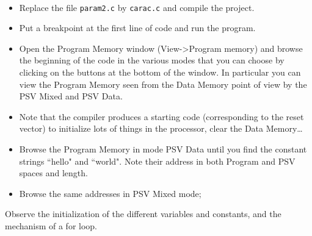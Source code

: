 \documentclass[10pt,a4paper]{article}
\theoremstyle{definition}%
\newcommand{\kw}[1]{\texttt{#1}}
\begin{document}
~

\begin{itemize}
\item Replace the file \kw{param2.c} by  \kw{carac.c}  and compile the project.
\item Put a breakpoint at the first line of code and run the program.
\item Open the Program Memory window (View->Program memory) and browse the beginning of the code in the various modes that you can choose by clicking on the buttons at the bottom of the window. In particular you can view the Program Memory seen from the Data Memory point of view by the PSV Mixed and PSV Data.
\item Note that the compiler produces a starting code (corresponding to the reset vector) to initialize lots of things in the processor, clear the Data Memory\dots

\item Browse the Program Memory in mode PSV Data until you find the constant strings ``hello" and ``world". Note their address in both Program and PSV spaces and length.

\item Browse the same addresses in PSV Mixed mode;
\end{itemize}






Observe the initialization of the different variables and constants, and the mechanism of a for loop.

\end{document}
